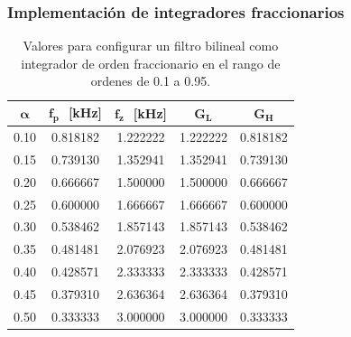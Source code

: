 \documentclass[10pt]{beamer}
\begin{document}
	\begin{frame}
		\frametitle{Implementación de integradores fraccionarios}
		\begin{minipage}[b]{0.45\textwidth}
			\begin{tiny}
			\begin{table}[!hbp]                                      
		\centering   
		\caption{Valores para configurar un filtro bilineal como integrador de orden fraccionario en el rango de ordenes de 0.1 a 0.95.}                            
		\label{tab:calculos_bilineal}                                        
			\begin{tabular}{ccccc}                        
			\hline                                              
			$\bm{\alpha}$ & $\bm{f_{p}}\,\,$ [kHz] & $\bm{f_{z}}\,\,$ [kHz] & $\bm{G_{L}}$ & $\bm{G_{H}}$ \\            
			\hline                                              
			0.10 & 0.818182 & 1.222222 & 1.222222 & 0.818182 \\  
			                                              
			0.15 & 0.739130 & 1.352941 & 1.352941 & 0.739130 \\  
			                                            
			0.20 & 0.666667 & 1.500000 & 1.500000 & 0.666667 \\  
			                                              
			0.25 & 0.600000 & 1.666667 & 1.666667 & 0.600000 \\  
			                                              
			0.30 & 0.538462 & 1.857143 & 1.857143 & 0.538462 \\  
			                                              
			0.35 & 0.481481 & 2.076923 & 2.076923 & 0.481481 \\  
			                                              
			0.40 & 0.428571 & 2.333333 & 2.333333 & 0.428571 \\  
			                                            
			0.45 & 0.379310 & 2.636364 & 2.636364 & 0.379310 \\  
			                                             
			0.50 & 0.333333 & 3.000000 & 3.000000 & 0.333333 \\  
			                                             

\end{tabular}
\end{table}
\end{tiny}
\end{minipage}
\end{frame}
\end{document}

